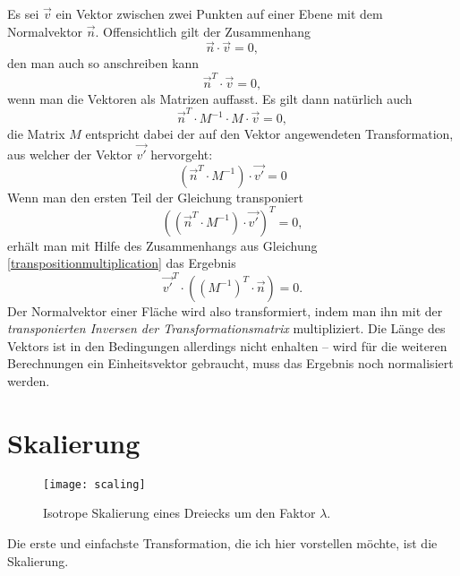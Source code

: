 Es sei $\vec v$ ein Vektor zwischen zwei Punkten auf einer Ebene mit dem Normalvektor $\vec n$. Offensichtlich gilt der Zusammenhang
\begin{equation}
 \vec n \cdot \vec v = 0,
\end{equation}
den man auch so anschreiben kann
\begin{equation}
 \vec{n}^T \cdot \vec{v} = 0,
\end{equation}
wenn man die Vektoren als Matrizen auffasst.  Es gilt dann natürlich auch
\begin{equation}
 \vec{n}^T \cdot M^{-1} \cdot M \cdot \vec{v} = 0,
\end{equation}
die Matrix $M$ entspricht dabei der auf den Vektor angewendeten Transformation, aus welcher der Vektor $\vec{v'}$ hervorgeht:
\begin{equation}
 \left( \vec{n}^T \cdot M^{-1} \right) \cdot \vec{v'} = 0
\end{equation}
Wenn man den ersten Teil der Gleichung transponiert
\begin{equation}
 \left( \left( \vec{n}^T \cdot M^{-1} \right) \cdot \vec{v'} \right)^T = 0,
\end{equation}
erhält man mit Hilfe des Zusammenhangs aus Gleichung \ref{transpositionmultiplication} das Ergebnis
\begin{equation}
 \vec{v'}^T \cdot \left( \left(M^{-1}\right)^T \cdot \vec{n} \right) = 0.
\end{equation}
Der Normalvektor einer Fläche wird also transformiert, indem man ihn mit der \emph{transponierten Inversen der Transformationsmatrix} multipliziert. Die Länge des Vektors ist in den Bedingungen allerdings nicht enhalten -- wird für die weiteren Berechnungen ein Einheitsvektor gebraucht, muss das Ergebnis noch normalisiert werden.

\section{Skalierung}
\label{scaling}

\begin{wrapfigure}{R}{0.5\textwidth}
  \vspace{-10pt}
  \texttt{[image: scaling]}
  \vspace{-10pt}
  \caption{Isotrope Skalierung eines Dreiecks um den Faktor $\lambda$.}
\end{wrapfigure}

Die erste und einfachste Transformation, die ich hier vorstellen möchte, ist die Skalierung.

